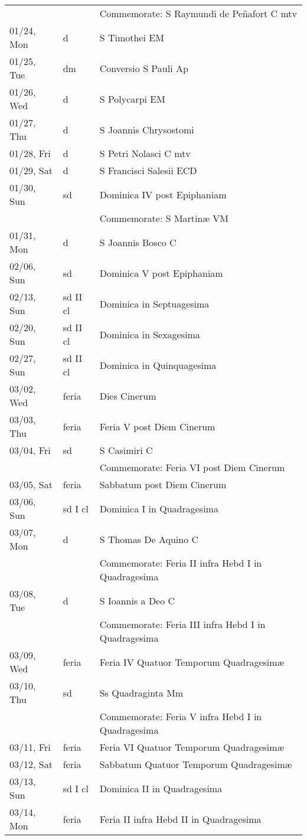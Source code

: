 \documentclass{article}
\begin{document}
\begin{longtable}{ l l l }
 & & Commemorate: S Raymundi de Peñafort C mtv\\
01/24, Mon & d & S Timothei EM\\
01/25, Tue & dm & Conversio S Pauli Ap\\
01/26, Wed & d & S Polycarpi EM\\
01/27, Thu & d & S Joannis Chrysostomi\\
01/28, Fri & d & S Petri Nolasci C mtv\\
01/29, Sat & d & S Francisci Salesii ECD\\
01/30, Sun & sd & Dominica IV post Epiphaniam\\
 & & Commemorate: S Martinæ VM\\
01/31, Mon & d & S Joannis Bosco C\\
02/06, Sun & sd & Dominica V post Epiphaniam\\
02/13, Sun & sd II cl & Dominica in Septuagesima\\
02/20, Sun & sd II cl & Dominica in Sexagesima\\
02/27, Sun & sd II cl & Dominica in Quinquagesima\\
03/02, Wed & feria & Dies Cinerum\\
03/03, Thu & feria & Feria V post Diem Cinerum\\
03/04, Fri & sd & S Casimiri C\\
 & & Commemorate: Feria VI post Diem Cinerum\\
03/05, Sat & feria & Sabbatum post Diem Cinerum\\
03/06, Sun & sd I cl & Dominica I in Quadragesima\\
03/07, Mon & d & S Thomas De Aquino C\\
 & & Commemorate: Feria II infra Hebd I in Quadragesima\\
03/08, Tue & d & S Ioannis a Deo C\\
 & & Commemorate: Feria III infra Hebd I in Quadragesima\\
03/09, Wed & feria & Feria IV Quatuor Temporum Quadragesimæ\\
03/10, Thu & sd & Ss Quadraginta Mm\\
 & & Commemorate: Feria V infra Hebd I in Quadragesima\\
03/11, Fri & feria & Feria VI Quatuor Temporum Quadragesimæ\\
03/12, Sat & feria & Sabbatum Quatuor Temporum Quadragesimæ\\
03/13, Sun & sd I cl & Dominica II in Quadragesima\\
03/14, Mon & feria & Feria II infra Hebd II in Quadragesima\\

\end{longtable}
\end{document}
